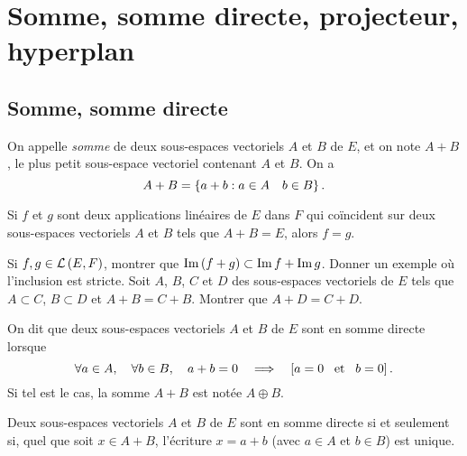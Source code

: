 \documentclass{magnoliaold}
\begin{document}
\section{Somme, somme directe, projecteur, hyperplan}
\subsection{Somme, somme directe}

\begin{definition}[utile=-3]
On appelle \emph{somme} de deux sous-espaces vectoriels $A$ et $B$ de $E$, et on
note $A+B$, le plus petit sous-espace vectoriel contenant $A$ et $B$. On a
\[A+B=\left\{a+b : a\in A \quad b\in B\right\}.\]
\end{definition}

\begin{remarqueUnique}
\remarque[utile=1] Si $f$ et $g$ sont deux applications linéaires de $E$ dans $F$ qui
  coïncident sur deux sous-espaces vectoriels $A$ et $B$ tels que $A+B=E$, alors
  $f=g$.
\end{remarqueUnique}

\begin{exos}
\exo Si $f,g\in\mathcal{L}\left(E,F\right)$, montrer que $\operatorname{Im}\left(f+g\right)\subset\operatorname{Im} f+\operatorname{Im} g$.
  Donner un exemple où l'inclusion est stricte.
\exo Soit $A$, $B$, $C$ et $D$ des sous-espaces vectoriels de $E$ tels que
  $A\subset C$, $B\subset D$ et $A+B=C+B$. Montrer que $A+D=C+D$.
\end{exos}

\begin{definition}[utile=-3]
On dit que deux sous-espaces vectoriels $A$ et $B$ de $E$ sont en somme
directe lorsque
\[\forall a\in A,\quad \forall b\in B,\quad a+b=0 \quad\Longrightarrow\quad \left[a=0 \quad\!\text{et}\quad\! b=0\right].\]
Si tel est le cas, la somme $A+B$ est notée $A\oplus B$.
\end{definition}

\begin{remarqueUnique}
\remarque Deux sous-espaces vectoriels $A$ et $B$ de $E$ sont en somme directe
  si et seulement si, quel que soit $x\in A+B$, l'écriture $x=a+b$
  (avec $a\in A$ et $b\in B$) est unique.
\end{remarqueUnique}

\end{document}
